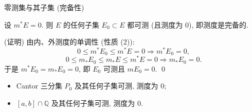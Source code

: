 
\begin{frame}{零测集与其子集 (完备性)}

\begin{prop}[零测集的子集可测]
设 $m^* E = 0$. 则 $E$ 的任何子集 $E_0 \subset E$ 都可测 (且测度为 $0$), 即测度是\alert{完备的}.
\end{prop}

\pause

\startproof[bg=yellow, fg=red](证明)
由内、外测度的单调性 (性质 (2)):
\[
0 \leqslant m^* E_0 \leqslant m^* E = 0 \Longrightarrow m^* E_0 = 0,
\]
\[
0 \leqslant m_* E_0 \leqslant m_* E \leqslant m^* E = 0 \Longrightarrow m_* E_0 = 0 .
\]
\pause
于是 $m^* E_0 = m_* E_0 = 0$, 即 $E_0$ 可测且 $m E_0 = 0$.
\qed

\pause

\begin{eg}
\begin{itemize}
\item Cantor 三分集 $P_0$ 及其任何子集可测, 测度为 $0$;
\item $[a,b] \cap \mathbb{Q}$ 及其任何子集可测, 测度为 $0$.
\end{itemize}
\end{eg}

\end{frame}


